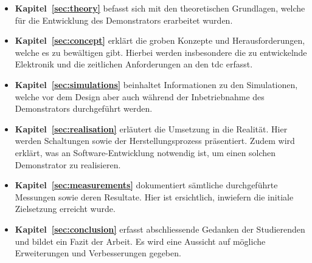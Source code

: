 \begin{itemize}
    \item \textbf{Kapitel~\ref{sec:theory}} befasst sich mit den theoretischen Grundlagen, welche für die Entwicklung des
          Demonstrators erarbeitet wurden.

    \item \textbf{Kapitel~\ref{sec:concept}} erklärt die groben Konzepte und Herausforderungen, welche es zu bewältigen gibt.
          Hierbei werden insbesondere die zu entwickelnde Elektronik und die zeitlichen Anforderungen an den \acrshort{tdc} erfasst.

    \item \textbf{Kapitel~\ref{sec:simulations}} beinhaltet Informationen zu den Simulationen, welche vor dem Design
           aber auch während der Inbetriebnahme des Demonstrators durchgeführt werden.

    \item \textbf{Kapitel~\ref{sec:realisation}} erläutert die Umsetzung in die Realität. Hier werden Schaltungen sowie
          der Herstellungsprozess präsentiert. Zudem wird erklärt, was an Software-Entwicklung notwendig ist, um einen
          solchen Demonstrator zu realisieren.

    \item \textbf{Kapitel~\ref{sec:measurements}} dokumentiert sämtliche durchgeführte Messungen sowie deren Resultate.
          Hier ist ersichtlich, inwiefern die initiale Zielsetzung erreicht wurde.

    \item \textbf{Kapitel~\ref{sec:conclusion}} erfasst abschliessende Gedanken der Studierenden und bildet ein Fazit der Arbeit.
          Es wird eine Aussicht auf mögliche Erweiterungen und Verbesserungen gegeben.
\end{itemize}
